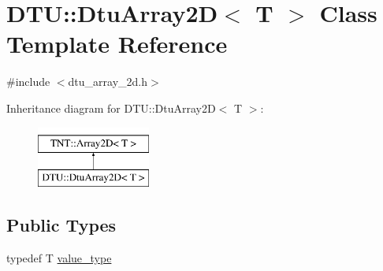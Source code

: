 \hypertarget{classDTU_1_1DtuArray2D}{\section{D\-T\-U\-:\-:Dtu\-Array2\-D$<$ T $>$ Class Template Reference}
\label{classDTU_1_1DtuArray2D}
}


{\ttfamily \#include $<$dtu\-\_\-array\-\_\-2d.\-h$>$}

Inheritance diagram for D\-T\-U\-:\-:Dtu\-Array2\-D$<$ T $>$\-:\begin{figure}[H]
\begin{center}
\leavevmode
\includegraphics[height=2.000000cm]{classDTU_1_1DtuArray2D}
\end{center}
\end{figure}
\subsection*{Public Types}
\begin{DoxyCompactItemize}
\item 
typedef T \hyperlink{classDTU_1_1DtuArray2D_afd205bf3e12c0c1a57d0a451fd45446d}{value\-\_\-type}
\end{DoxyCompactItemize}
